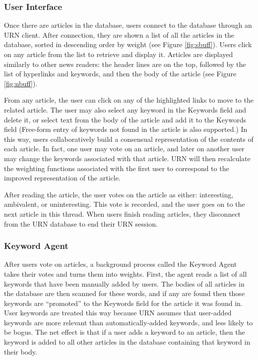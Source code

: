 \subsubsection{User Interface}

Once there are articles in the database, users connect to the database
through an URN client. After connection, they are shown a list of all the
articles in the database, sorted in descending order by weight (see Figure
\ref{fig:sbuff}). Users click on any article from the list to retrieve and
display it. Articles are displayed similarly to other news readers: the
header lines are on the top, followed by the list of hyperlinks and
keywords, and then the body of the article (see Figure \ref{fig:nbuff}).

\begin{figure*}[t]
  {\centerline{}}
  \caption{An Article Displayed with URN. Articles are displayed along
  with a field containing a list of keywords representing the
  collaboratively built, consensual representation of the content of this
  article.}
  \label{fig:nbuff}
\end{figure*}

From any article, the user can click on any of the highlighted links to
move to the related article.  The user may also select any keyword in the
Keywords field and delete it, or select text from the body of the article
and add it to the Keywords field (Free-form entry of keywords not found in
the article is also supported.) In this way, users collaboratively build a
consensual representation of the contents of each article. In fact, one
user may vote on an article, and later on another user may change the
keywords associated with that article.  URN will then recalculate the
weighting functions associated with the first user to correspond to the
improved representation of the article.

After reading the article, the user votes on the article as either:
interesting, ambivalent, or uninteresting. This vote is recorded, and the user
goes on to the next article in this thread. When users finish reading articles,
they disconnect from the URN database to end their URN session.

\subsubsection{Keyword Agent}

After users vote on articles, a background process called the Keyword Agent
takes their votes and turns them into weights. First, the agent reads a
list of all keywords that have been manually added by users. The bodies of
all articles in the database are then scanned for these words, and if any
are found then those keywords are ``promoted'' to the Keywords field for
the article it was found in. User keywords are treated this way because URN
assumes that user-added keywords are more relevant than automatically-added
keywords, and less likely to be bogus. The net effect is that if a user
adds a keyword to an article, then the keyword is added to all other
articles in the database containing that keyword in their body.

